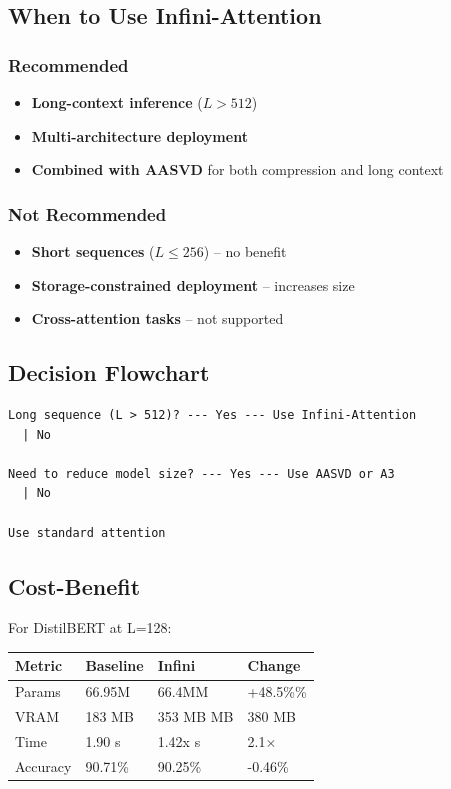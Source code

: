 \subsection{When to Use Infini-Attention}

\subsubsection{Recommended}

\begin{itemize}
\item \textbf{Long-context inference} ($L > 512$)
\item \textbf{Multi-architecture deployment}
\item \textbf{Combined with AASVD} for both compression and long context

\end{itemize}
\subsubsection{Not Recommended}

\begin{itemize}
\item \textbf{Short sequences} ($L \leq 256$) -- no benefit
\item \textbf{Storage-constrained deployment} -- increases size
\item \textbf{Cross-attention tasks} -- not supported

\end{itemize}
\subsection{Decision Flowchart}

\begin{lstlisting}
Long sequence (L > 512)? --- Yes --- Use Infini-Attention
  | No
   
Need to reduce model size? --- Yes --- Use AASVD or A3
  | No
   
Use standard attention
\end{lstlisting}

\subsection{Cost-Benefit}

For DistilBERT at L=128:

\begin{table}[H]
\centering
\small
\begin{tabular}{llll}
\toprule
\textbf{Metric} & \textbf{Baseline} & \textbf{Infini} & \textbf{Change} \\
\midrule
Params & 66.95M & 66.4MM & +48.5\%\% \\
VRAM & 183 MB & 353 MB MB & 380 MB \\
Time & 1.90 s & 1.42x s & 2.1$\times$ \\
Accuracy & 90.71\% & 90.25\% & -0.46\% \\
\bottomrule
\end{tabular}
\end{table}

